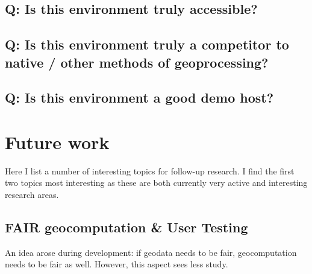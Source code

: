 \subsection*{Q: Is this environment truly accessible?}


\subsection*{Q: Is this environment truly a competitor to native / other methods of geoprocessing?}

\subsection*{Q: Is this environment a good demo host?}




\section{Future work}
\label{sec:future-work}

Here I list a number of interesting topics for follow-up research. 
I find the first two topics most interesting as these are both currently very active and interesting research areas.

\subsection{FAIR geocomputation \& User Testing}

An idea arose during development: if geodata needs to be fair, geocomputation needs to be fair as well. 
However, this aspect sees less study.

  
  



